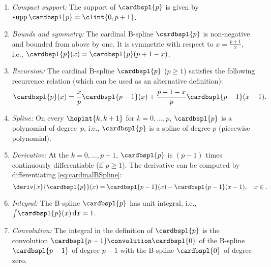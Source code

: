 \begin{enumerate}
  \item
  \emph{Compact support:}
  The support of $\cardbspl{p}$ is given by $\supp \cardbspl{p} = \clint{0, p + 1}$.
  
  \item
  \emph{Bounds and symmetry:}
  The cardinal B-spline $\cardbspl{p}$ is non-negative and bounded from above by one.
  It is symmetric with respect to $x = \tfrac{p+1}{2}$, i.e.,
  $\cardbspl{p}(x) = \cardbspl{p}(p + 1 - x)$.
  
  \item
  \emph{Recursion:}
  The cardinal B-spline $\cardbspl{p}$ ($p \ge 1$)
  satisfies the following recurrence relation
  (which can be used as an alternative definition):
  \begin{equation}
    \cardbspl{p}(x)
    = \frac{x}{p} \cardbspl{p-1}(x) + \frac{p+1-x}{p} \cardbspl{p-1}(x-1).
  \end{equation}
  
  \item
  \emph{Spline:}
  On every  $\hopint{k, k+1}$ for $k = 0, \dotsc, p$,
  $\cardbspl{p}$ is a polynomial of degree~$p$, i.e.,
  $\cardbspl{p}$ is a spline of degree $p$ (piecewise polynomial).
  
  \item
  \emph{Derivative:}
  At the  $k = 0, \dotsc, p + 1$,
  $\cardbspl{p}$ is $(p - 1)$ times continuously differentiable (if $p \ge 1$).
  The derivative can be computed by differentiating
  \eqref{eq:cardinalBSpline}:
  \begin{equation}
    \label{eq:cardinalBSplineDerivative}
    \deriv{x}{\cardbspl{p}}(x)
    = \cardbspl{p-1}(x) - \cardbspl{p-1}(x-1),\quad
    x \in \real.
  \end{equation}
  
  \item
  \emph{Integral:}
  The B-spline $\cardbspl{p}$ has unit integral, i.e.,
  $\int_{\real} \cardbspl{p}(x) \dx = 1$.
  
  \item
  \emph{Convolution:}
  The integral in the definition of $\cardbspl{p}$
  is the convolution $\cardbspl{p-1} \convolution \cardbspl{0}$
  of the B-spline $\cardbspl{p-1}$
  of degree $p - 1$ with the B-spline $\cardbspl{0}$ of degree zero.
  

\end{enumerate}
